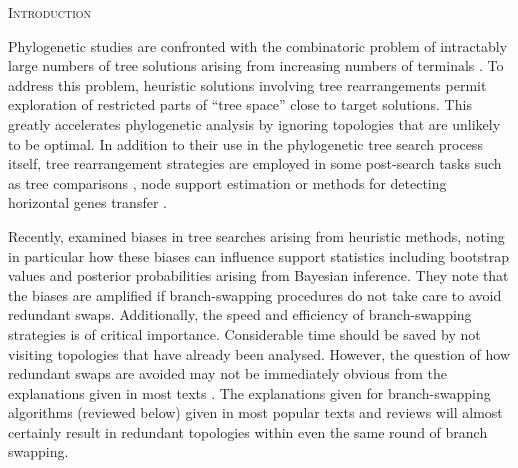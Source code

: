 \documentclass[12pt,letterpaper]{article}
\renewcommand{\section}[1]{%
\bigskip
\begin{center}
\begin{Large}
\normalfont\scshape #1
\medskip
\end{Large}
\end{center}}
\begin{document}
\section{Introduction}

Phylogenetic studies are confronted with the combinatoric problem of intractably large numbers of tree solutions arising from increasing numbers of terminals \citep{Felsenstein:1978vh}.
To address this problem, heuristic solutions involving tree rearrangements permit exploration of restricted parts of ``tree space'' close to target solutions.
This greatly accelerates phylogenetic analysis by ignoring topologies that are unlikely to be optimal.
In addition to their use in the phylogenetic tree search process itself, tree rearrangement strategies are employed in some post-search tasks such as tree comparisons \citep[e.g.][]{allen2001subtree,kuhner2015treComparison}, node support estimation \citep[e.g.][]{goloboff2014bias} or methods for detecting horizontal genes transfer \citep[e.g.][]{mcfadden1995something,bordewich2005computational}.

Recently, \citet{goloboff2014bias} examined biases in tree searches arising from heuristic methods, noting in particular how these biases can influence support statistics including bootstrap values and posterior probabilities arising from %
Bayesian inference. %
They note that the biases are amplified if branch-swapping procedures do not take care to avoid redundant swaps.
Additionally, the speed and efficiency of branch-swapping strategies is of critical importance.
Considerable time should be saved by not visiting topologies that have already been analysed.
However, the question of how redundant swaps are avoided may not be immediately obvious from the explanations given in most texts \citep{swofford2003phylogeny,felsenstein2004inferring,wiley2011phylogenetics}.
The explanations given for branch-swapping algorithms (reviewed below) given in most popular texts and reviews will almost certainly result in redundant topologies within even the same round of branch swapping.
\end{document}
